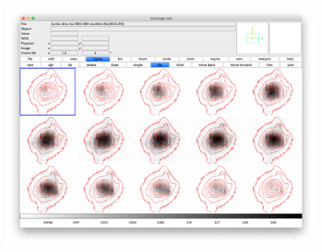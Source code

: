 \documentclass[useAMS, usenatbib]{mnras}
\begin{document}
\begin{figure}[!t]
\centering
\includegraphics[width=0.9\textwidth]{ha-maps.png}
  \caption{  }
\end{figure}
\end{document}
